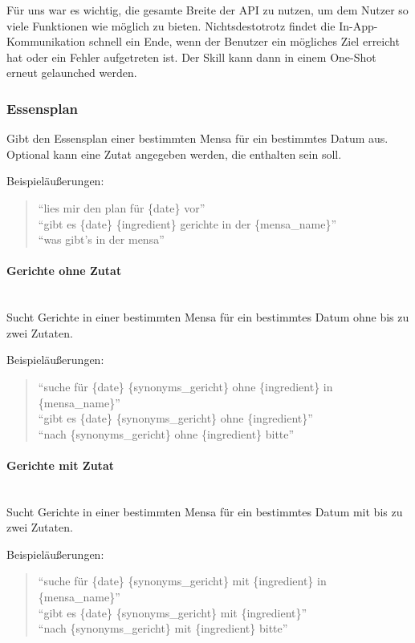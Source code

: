 \documentclass[12pt]{article}
\begin{document}
Für uns war es wichtig, die gesamte Breite der API zu nutzen, um dem Nutzer so viele Funktionen wie möglich zu bieten.
Nichtsdestotrotz findet die In-App-Kommunikation schnell ein Ende, wenn der Benutzer ein mögliches Ziel erreicht hat oder ein Fehler aufgetreten ist.
Der Skill kann dann in einem One-Shot erneut gelaunched werden.

\subsubsection{Essensplan}
Gibt den Essensplan einer bestimmten Mensa für ein bestimmtes Datum aus. Optional kann eine Zutat angegeben werden, die enthalten sein soll. 

Beispieläußerungen:
\begin{quote}
“lies mir den plan für \{date\} vor”\\
“gibt es \{date\} \{ingredient\} gerichte in der \{mensa\_name\}”\\
“was gibt's in der mensa”
\end{quote}

\paragraph{Gerichte ohne Zutat}~\\
Sucht Gerichte in einer bestimmten Mensa für ein bestimmtes Datum ohne bis zu zwei Zutaten.

Beispieläußerungen:
\begin{quote}
“suche für \{date\} \{synonyms\_gericht\} ohne \{ingredient\} in \{mensa\_name\}”\\
“gibt es \{date\} \{synonyms\_gericht\} ohne \{ingredient\}”\\
“nach \{synonyms\_gericht\} ohne \{ingredient\} bitte”\\
\end{quote} 

\paragraph{Gerichte mit Zutat}~\\
Sucht Gerichte in einer bestimmten Mensa für ein bestimmtes Datum mit bis zu zwei Zutaten. 

Beispieläußerungen:
\begin{quote}
“suche für \{date\} \{synonyms\_gericht\} mit \{ingredient\} in \{mensa\_name\}”\\
“gibt es \{date\} \{synonyms\_gericht\} mit \{ingredient\}”\\
“nach \{synonyms\_gericht\} mit \{ingredient\} bitte”\\
\end{quote}
\end{document}
